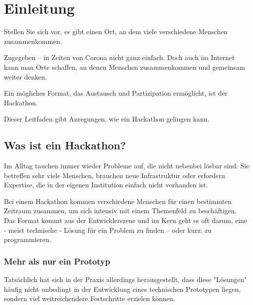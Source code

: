 

\setchapterpreamble[u]{\margintoc}
\chapter{Einleitung}


Stellen Sie sich vor, es gibt einen Ort, an dem viele verschiedene Menschen zusammenkommen.

Zugegeben – in Zeiten von Corona nicht ganz einfach. Doch auch im Internet kann man Orte schaffen, an denen Menschen zusammenkommen und gemeinsam weiter denken.

Ein mögliches Format, das Austausch und Partizipation ermöglicht, ist der Hackathon. 

Dieser Leitfaden gibt Anregungen, wie ein Hackathon gelingen kann.

\newpage

\section{Was ist ein Hackathon?}

Im Alltag tauchen immer wieder Probleme auf, die nicht nebenbei lösbar sind: Sie betreffen sehr viele Menschen, brauchen neue Infrastruktur oder erfordern Expertise, die in der eigenen Institution einfach nicht vorhanden ist.

Bei einem Hackathon kommen verschiedene Menschen für einen bestimmten Zeitraum zusammen, um sich intensiv mit einem Themenfeld zu beschäftigen. Das Format kommt aus der Entwicklerszene und im Kern geht es oft darum, eine - meist technische - Lösung für ein Problem zu finden – oder kurz: zu programmieren.


\subsection*{Mehr als nur ein Prototyp}

Tatsächlich hat sich in der Praxis allerdings herausgestellt, dass diese "Lösungen" häufig nicht unbedingt in der Entwicklung eines technischen Prototypen liegen, sondern viel weitreichendere Fortschritte erzielen können. 

